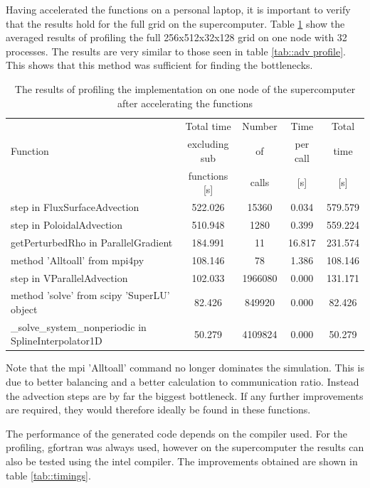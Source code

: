 Having accelerated the functions on a personal laptop, it is important to verify that the results hold for the full grid on the supercomputer. Table \ref{tab::draco profile} show the averaged results of profiling the full 256x512x32x128 grid on one node with 32 processes. The results are very similar to those seen in table \ref{tab::adv profile}. This shows that this method was sufficient for finding the bottlenecks.

\begin{table}[ht]
\centering
 \begin{tabular}{|m{}|c|c|c|c|}
  \hline
          & Total time & Number & Time & Total \\
  Function & excluding sub & of & per call & time \\
          & functions [s] & calls & [s] & [s] \\
  \hline
  \hline
  step in FluxSurfaceAdvection & 522.026 & 15360 & 0.034 & 579.579 \\
  \hline
  step in PoloidalAdvection & 510.948 & 1280 & 0.399 & 559.224 \\
  \hline
  getPerturbedRho in ParallelGradient & 184.991 & 11 & 16.817 & 231.574 \\
  \hline
  method 'Alltoall' from mpi4py & 108.146 & 78 & 1.386 & 108.146 \\
  \hline
  step in VParallelAdvection & 102.033 & 1966080 & 0.000 & 131.171 \\
  \hline
  method 'solve' from scipy 'SuperLU' object & 82.426 & 849920 & 0.000 & 82.426 \\
  \hline
  \_solve\_system\_nonperiodic in SplineInterpolator1D & 50.279 & 4109824 & 0.000 & 50.279 \\
  \hline
 \end{tabular}
 \caption{\label{tab::draco profile} The results of profiling the implementation on one node of the supercomputer after accelerating the functions}
\end{table}

Note that the mpi 'Alltoall' command no longer dominates the simulation. This is due to better balancing and a better calculation to communication ratio. Instead the advection steps are by far the biggest bottleneck. If any further improvements are required, they would therefore ideally be found in these functions.

The performance of the generated code depends on the compiler used. For the profiling, gfortran was always used, however on the supercomputer the results can also be tested using the intel compiler. The improvements obtained are shown in table \ref{tab::timings}.

